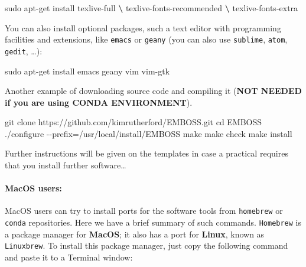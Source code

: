 \documentclass[10pt,a4paper,]{article}
\newenvironment{Shaded}{}{}
\newcommand{\BuiltInTok}[1]{#1}
\newcommand{\ExtensionTok}[1]{#1}
\newcommand{\FunctionTok}[1]{\textcolor[rgb]{0.02,0.16,0.49}{#1}}
\newcommand{\KeywordTok}[1]{\textcolor[rgb]{0.00,0.44,0.13}{\textbf{#1}}}
\newcommand{\NormalTok}[1]{#1}
\begin{document}
\begin{Shaded}
\begin{Highlighting}[]
\FunctionTok{sudo}\NormalTok{ apt{-}get install texlive{-}full }\KeywordTok{\textbackslash{}}
                     \ExtensionTok{texlive{-}fonts{-}recommended} \KeywordTok{\textbackslash{}}
                     \ExtensionTok{texlive{-}fonts{-}extra}
\end{Highlighting}
\end{Shaded}

You can also install optional packages, such a text editor with
programming facilities and extensions, like \texttt{emacs} or
\texttt{geany} (you can also use \texttt{sublime}, \texttt{atom},
\texttt{gedit}, \ldots):

\begin{Shaded}
\begin{Highlighting}[]
\FunctionTok{sudo}\NormalTok{ apt{-}get install emacs geany vim vim{-}gtk}
\end{Highlighting}
\end{Shaded}

Another example of downloading source code and compiling it (\textbf{NOT
NEEDED if you are using CONDA ENVIRONMENT}).

\begin{Shaded}
\begin{Highlighting}[]
\FunctionTok{git}\NormalTok{ clone https://github.com/kimrutherford/EMBOSS.git}
\BuiltInTok{cd}\NormalTok{ EMBOSS}
\ExtensionTok{./configure}\NormalTok{ {-}{-}prefix=/usr/local/install/EMBOSS}
\FunctionTok{make}
\FunctionTok{make}\NormalTok{ check}
\FunctionTok{make}\NormalTok{ install}
\end{Highlighting}
\end{Shaded}

Further instructions will be given on the templates in case a practical
requires that you install further software\ldots{}

\hypertarget{macos-users}{%
\paragraph{\texorpdfstring{\textbf{MacOS}
users:}{MacOS users:}}\label{macos-users}}

MacOS users can try to install ports for the software tools from
\texttt{homebrew} or \texttt{conda} repositories. Here we have a brief
summary of such commands. \texttt{Homebrew} is a package manager for
\textbf{MacOS}; it also has a port for \textbf{Linux}, known as
\texttt{Linuxbrew}. To install this package manager, just copy the
following command and paste it to a Terminal window:
\end{document}

